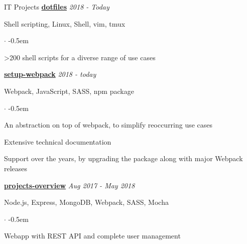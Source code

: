 \documentclass{cv}
\begin{document}
\begin{rSection}{IT Projects}
  \textbf{\href{https://github.com/jneidel/dotfiles}{dotfiles}}
  \hfill
  {\em 2018 - Today}

  Shell scripting, Linux, Shell, vim, tmux
  \begin{list}{$\cdot$}{}
    \itemsep -0.5em \vspace{-0.5em}
    \smallskip
    \item \textgreater200 shell scripts for a diverse range of use cases
  \end{list}

  \textbf{\href{https://github.com/jneidel/setup-webpack}{setup-webpack}}
  \hfill
  {\em 2018 - today}

  Webpack, JavaScript, SASS, npm package
  \begin{list}{$\cdot$}{}
    \itemsep -0.5em \vspace{-0.5em}
    \smallskip
    \item An abstraction on top of webpack, to simplify reoccurring use cases
    \item Extensive technical documentation
    \item Support over the years, by upgrading the package along with major Webpack releases
  \end{list}

  \textbf{\href{https://github.com/jneidel/projects-overview}{projects-overview}}
  \hfill
  {\em Aug 2017 - May 2018}

  Node.js, Express, MongoDB, Webpack, SASS, Mocha
  \begin{list}{$\cdot$}{}
    \itemsep -0.5em \vspace{-0.5em}
    \smallskip
    \item Webapp with REST API and complete user management
  \end{list}



\end{rSection}
\end{document}
